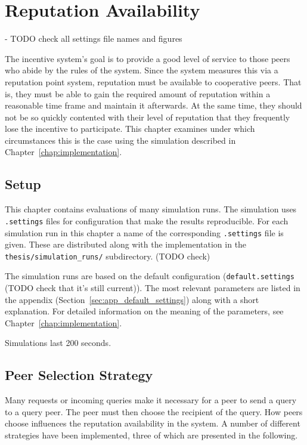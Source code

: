 \chapter{Reputation Availability}
\label{chap:rep_avail}
- TODO check all settings file names and figures

The incentive system's goal is to provide a good level of service to those peers
who abide by the rules of the system. Since the system measures this via a
reputation point system, reputation must be available to cooperative peers.
That is, they must be able to gain the required amount of reputation within a
reasonable time frame and maintain it afterwards. At the same time, they should
not be so quickly contented with their level of reputation that they frequently
lose the incentive to participate. This chapter examines under which
circumstances this is the case using the simulation described in
Chapter~\ref{chap:implementation}.

\section{Setup}
This chapter contains evaluations of many simulation runs. The simulation uses
\texttt{.settings} files for configuration that make the results reproducible.
For each simulation run in this chapter a name of the corresponding
\texttt{.settings} file is given. These are distributed along with the
implementation in the \texttt{thesis/simulation\_runs/} subdirectory. (TODO
check)

The simulation runs are based on the default configuration
(\texttt{default.settings} (TODO check that it's still current)). The most
relevant parameters are listed in the appendix
(Section~\ref{sec:app_default_settings}) along with a short explanation. For
detailed information on the meaning of the parameters, see
Chapter~\ref{chap:implementation}.

Simulations last 200 seconds.

\section{Peer Selection Strategy}
\label{sec:selection}
Many requests or incoming queries make it necessary for a peer to send a query
to a query peer. The peer must then choose the recipient of the query. How peers
choose influences the reputation availability in the system. A number of
different strategies have been implemented, three of which are presented in the
following.


